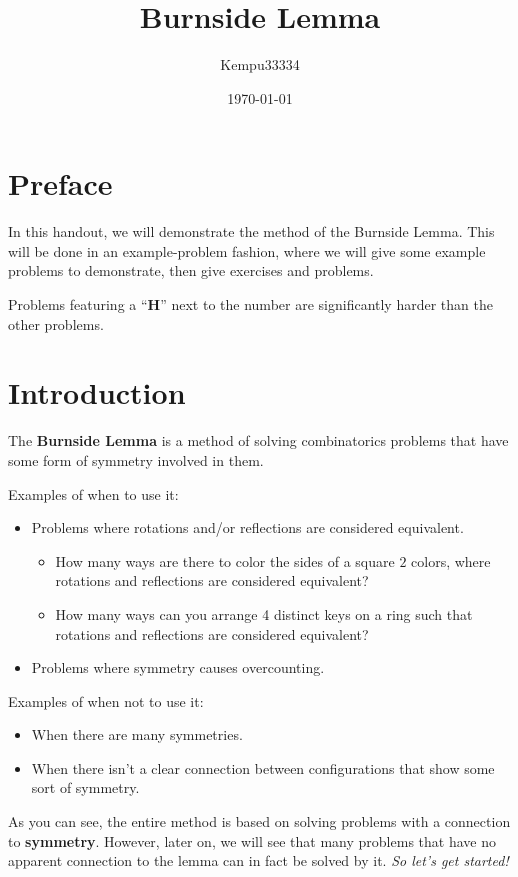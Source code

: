 \documentclass[11pt]{scrartcl}
\title{Burnside Lemma}
\author{\LARGE Kempu33334}
\date{\large \today}
\begin{document}
\maketitle

\section{Preface}
\large

In this handout, we will demonstrate the method of the Burnside Lemma. This will be done in an example-problem fashion, where we will give some example problems to demonstrate, then give exercises and problems. 

Problems featuring a ``\textbf{H}'' next to the number are significantly harder than the other problems.

\section{Introduction}

The \textbf{Burnside Lemma} is a method of solving combinatorics problems that have some form of symmetry involved in them.

\begin{example*}
  Examples of when to use it:
  \begin{itemize}
  \item Problems where rotations and/or reflections are considered equivalent.
  \begin{itemize}
      \item How many ways are there to color the sides of a square $2$ colors, where rotations and reflections are considered equivalent?
      \item How many ways can you arrange 4 distinct keys on a ring such that rotations and reflections are considered equivalent?
  \end{itemize}
  \item Problems where symmetry causes overcounting.
  \end{itemize}
  Examples of when not to use it:
  \begin{itemize}
      \item When there are many symmetries.
      \item When there isn't a clear connection between configurations that show some sort of symmetry.
  \end{itemize}
\end{example*}

As you can see, the entire method is based on solving problems with a connection to \textbf{symmetry}. However, later on, we will see that many problems that have no apparent connection to the lemma can in fact be solved by it. \textit{So let's get started!}
\end{document}
